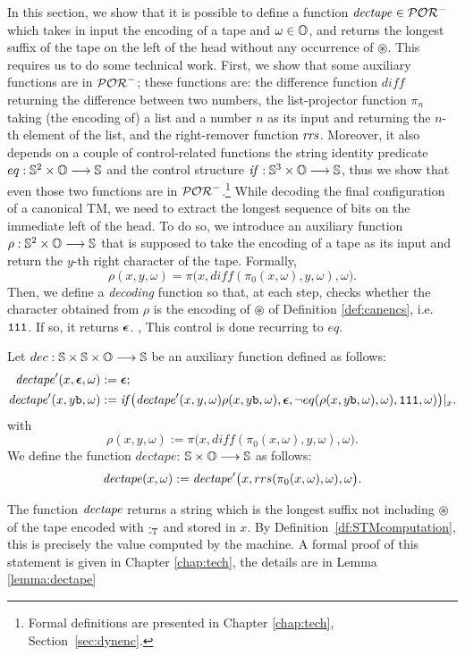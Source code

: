 In this section, we show that it is possible to define a function
$\mathit{dectape} \in \mathcal{POR}^-$ which takes in input the encoding of a tape and
$\omega \in \mathbb{O}$, and returns the longest suffix of the tape on the left of the
head without any occurrence of $\circledast$. This requires us to do some
technical work. First, we show that
some auxiliary functions are in $\mathcal{POR}^-$; these functions are:
the difference function $\mathit{diff}$ returning the difference
between two numbers,
the list-projector function $\pi_n$
taking (the encoding of) a list
and a number $n$ as its input and returning
the $n$-th element of the list,
and the right-remover function $\mathit{rrs}$.
Moreover, it also depends on a couple of control-related functions
the string identity predicate $eq: \mathbb{S}^2 \times \mathbb{O} \longrightarrow \mathbb{S}$
and the control structure
$\mathit{if}: \mathbb{S}^3 \times \mathbb{O} \longrightarrow \mathbb{S}$, thus
we show that even those two functions are in $\mathcal{POR}^-$.\footnote{Formal
definitions are presented in Chapter \ref{chap:tech}, Section~\ref{sec:dynenc}.}
%
%
%
%
%
%
While decoding the final configuration of a
canonical TM,
we need to extract the longest
sequence of bits on the immediate
left of the head.
%
To do so, we introduce an auxiliary
function $\rho:\mathbb{S}^2\times \mathbb{O} \longrightarrow \mathbb{S}$
that is supposed to take the encoding of a tape
as its input and return the $y$-th right character
of the tape.
Formally,
%
$$
\rho(x,y,\omega) = \pi\big(x,
\mathit{diff}(\pi_0(x,\omega), y,\omega),\omega\big).
$$
Then, we define a \emph{decoding}
function so that, at each step,
checks whether the character obtained from
$\rho$ is the encoding of $\circledast$ of Definition \ref{def:canencs}, i.e.
$\mathtt{1}\mathtt{1}\mathtt{1}$.
If so, it returns $\bm{\epsilon}$. ,
This control is done recurring to $eq$.
%







\begin{defn}
  \label{def:dectape}
Let $dec :\mathbb{S}\times \mathbb{S} \times \mathbb{O}
\longrightarrow \mathbb{S}$ be an auxiliary function defined
as follows:
\begin{align*}
\mathit{dectape}'(x,\bm{\epsilon},\omega) &:= \bm{\epsilon}; \\
\mathit{dectape}'(x, y\mathtt{b},\omega) &:= \mathit{if}\big(\mathit{dectape}'(x,y,\omega)
\rho (x,y\mathtt{b},\omega), \bm{\epsilon},
\lnot eq(\rho(x,y\mathtt{b},\omega),\omega), \mathtt{1}\mathtt{1}\mathtt{1},\omega)\big)|_{x}.
\end{align*}
with
$$
\rho(x,y,\omega) := \pi\big(x,
\mathit{diff}(\pi_0(x,\omega), y,\omega),\omega\big).
$$
We define the function $\mathit{dectape}$:
$\mathbb{S}  \times \mathbb{O} \longrightarrow \mathbb{S}$
as follows:
$$
\mathit{dectape}(x,\omega) := \mathit{dectape}'\big(x,rrs(\pi_0(x,\omega),\omega),
\omega\big).
$$
\end{defn}
%
%
\noindent
The function $\mathit{dectape}$ returns a string which is the
longest suffix not including $\circledast$
of the tape encoded with ${\underline{\cdot}}_{\mathbb{T}}$ and stored in $x$.
By Definition~\ref{df:STMcomputation}, this is precisely
the value computed by the machine.
A formal proof of this statement
is given in Chapter \ref{chap:tech}, the details are in Lemma \ref{lemma:dectape}

